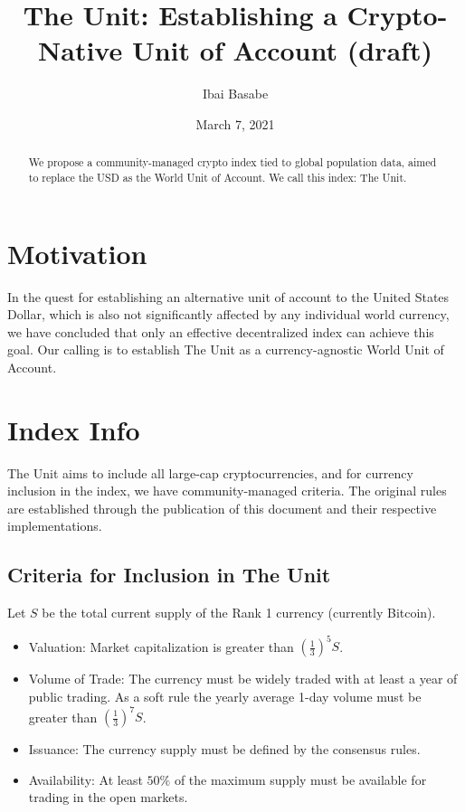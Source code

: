 \documentclass[12pt]{article}
\title{The Unit: Establishing a Crypto-Native Unit of Account (draft)}
\author{Ibai Basabe}
\begin{document}
\date{March 7, 2021}

\pagecolor{yellow!15!}

\maketitle


\begin{abstract}
We propose a community-managed crypto index tied to global population data, aimed to replace the USD as the World Unit of Account. We call this index: The Unit. 
\end{abstract}


\tableofcontents
\newpage

\section{Motivation}

In the quest for establishing an alternative unit of account to the United States Dollar, which is also not significantly affected by any individual world currency, we have concluded that only an effective decentralized index can achieve this goal. Our calling is to establish The Unit as a currency-agnostic World Unit of Account. 

\section{Index Info}

The Unit aims to include all large-cap cryptocurrencies, and for currency inclusion in the index, we have community-managed criteria. The original rules are established through the publication of this document and their respective implementations.

\subsection{Criteria for Inclusion in The Unit}

Let $S$ be the total current supply of the Rank 1 currency (currently Bitcoin).

\begin{itemize}

\item Valuation: Market capitalization is greater than $\left(\frac{1}{3}\right)^5 S$.
\item Volume of Trade: The currency must be widely traded with at least a year of public trading. As a soft rule the yearly average 1-day volume must be greater than $\left(\frac{1}{3}\right)^7 S$.
\item Issuance: The currency supply must be defined by the consensus rules.
\item Availability: At least $50\%$ of the maximum supply must be available for trading in the open markets.

\end{itemize}
\end{document}
